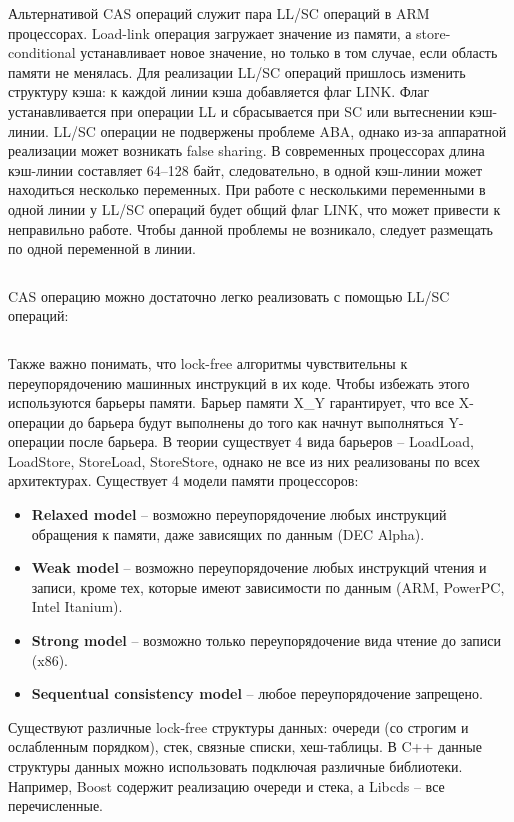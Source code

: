 Альтернативой CAS операций служит пара LL/SC операций в ARM процессорах. Load-link операция загружает значение из памяти, а store-conditional устанавливает новое значение, но только в том случае, если область памяти не менялась. Для реализации LL/SC операций пришлось изменить структуру кэша: к каждой линии кэша добавляется флаг LINK. Флаг устанавливается при операции LL и сбрасывается при SC или вытеснении кэш-линии. LL/SC операции не подвержены проблеме ABA, однако из-за аппаратной реализации может возникать false sharing. В современных процессорах длина кэш-линии составляет 64--128 байт, следовательно, в одной кэш-линии может находиться несколько переменных. При работе с несколькими переменными в одной линии у LL/SC операций будет общий флаг LINK, что может привести к неправильно работе. Чтобы данной проблемы не возникало, следует размещать по одной переменной в линии.

\inputminted{c++}{listings/falseSharingLLSCExample.cpp}

CAS операцию можно достаточно легко реализовать с помощью LL/SC операций:

\inputminted{c++}{listings/LLSCthroughCAS.cpp}

Также важно понимать, что lock-free алгоритмы чувствительны к переупорядочению машинных инструкций в их коде. Чтобы избежать этого используются барьеры памяти. Барьер памяти X\_Y гарантирует, что все X-операции до барьера будут выполнены до того как начнут выполняться Y-операции после барьера. В теории существует 4 вида барьеров -- LoadLoad, LoadStore, StoreLoad, StoreStore, однако не все из них реализованы по всех архитектурах. Существует 4 модели памяти процессоров: 
	
\begin{itemize}  
    \item\textbf{Relaxed model} -- возможно переупорядочение любых инструкций обращения к памяти, даже зависящих по данным (DEC Alpha).
    \item\textbf{Weak model} -- возможно переупорядочение любых инструкций чтения и записи, кроме тех, которые имеют зависимости по данным (ARM, PowerPC, Intel Itanium).
    \item\textbf{Strong model } -- возможно только переупорядочение вида чтение до записи (x86).
    \item\textbf{Sequentual consistency model} -- любое переупорядочение запрещено.
\end{itemize}

Существуют различные lock-free структуры данных: очереди (со строгим и ослабленным порядком), стек, связные списки, хеш-таблицы. В C++ данные структуры данных можно использовать подключая различные библиотеки. Например, Boost содержит реализацию очереди и стека, а Libcds -- все перечисленные.

